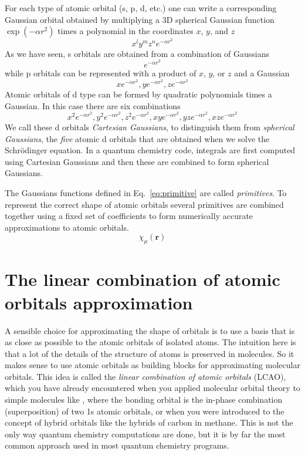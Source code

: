\documentclass[../Main/chem371-notes.tex]{subfiles}
\begin{document}
For each type of atomic orbital (s, p, d, etc.) one can write a corresponding Gaussian orbital obtained by multiplying a 3D spherical Gaussian function $\exp(-\alpha r^2)$ times a polynomial in the coordinates $x$, $y$, and $z$
\begin{equation}
\label{eq:primitive}
x^l y^m z^n e^{-\alpha r^2}
\end{equation}
As we have seen, s orbitals are obtained from a combination of Gaussians
\begin{equation}
e^{-\alpha r^2}
\end{equation}
while p orbitals can be represented with a product of $x$, $y$, or $z$ and a Gaussian
\begin{equation}
x e^{-\alpha r^2}, y e^{-\alpha r^2}, z e^{-\alpha r^2}
\end{equation}
Atomic orbitals of d type can be formed by quadratic polynomials times a Gaussian.
In this case there are six combinations
\begin{equation}
x^2 e^{-\alpha r^2}, y^2 e^{-\alpha r^2}, z^2 e^{-\alpha r^2},
xy e^{-\alpha r^2}, yz e^{-\alpha r^2}, xz e^{-\alpha r^2}
\end{equation}
We call these d orbitals \emph{Cartesian Gaussians}, to distinguish them from \emph{spherical Gaussians}, the \emph{five} atomic d orbitals that are obtained when we solve the Schr\"{o}dinger equation.
In a quantum chemistry code, integrals are first computed using Cartesian Gaussians and then these are combined to form spherical Gaussians.

The Gaussians functions defined in Eq.~\eqref{eq:primitive} are called \emph{primitives}. To represent the correct shape of atomic orbitals several primitives are combined together using a fixed set of coefficients to form numerically accurate approximations to atomic orbitals.
\begin{equation}
\chi_\mu(\mathbf{r})
\end{equation}


\section{The linear combination of atomic orbitals approximation}
A sensible choice for approximating the shape of orbitals is to use a basis that is as close as possible to the atomic orbitals of isolated atoms.
The intuition here is that a lot of the details of the structure of atoms is preserved in molecules.
So it makes sense to use atomic orbitals as building blocks for approximating molecular orbitals.
This idea is called the \emph{linear combination of atomic orbitals} (LCAO), which you have already encountered when you applied molecular orbital theory to simple molecules like , where the bonding orbital is the in-phase combination (superposition) of two 1s atomic orbitals, or when you were introduced to the concept of hybrid orbitals like the  hybrids of carbon in methane.
This is not the only way quantum chemistry computations are done, but it is by far the most common approach used in most quantum chemistry programs.
\end{document}
